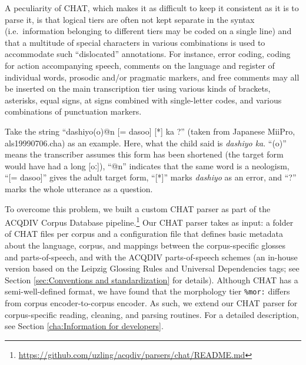 \documentclass[a4paper, 11pt]{book}
\begin{document}
A peculiarity of CHAT, which makes it as difficult to keep it consistent as it is to parse it, is that logical tiers are often not kept separate in the syntax (i.e.\ information belonging to different tiers may be coded on a single line) and that a multitude of special characters in various combinations is used to accommodate such “dislocated” annotations. For instance, error coding, coding for action accompanying speech, comments on the language and register of individual words, prosodic and/or pragmatic markers, and free comments may all be inserted on the main transcription tier using various kinds of brackets, asterisks, equal signs, at signs combined with single-letter codes, and various combinations of punctuation markers. 

Take the string “dashiyo(o)@n [= dasoo] [*] ka ?” (taken from Japanese MiiPro, als19990706.cha) as an example. Here, what the child said is \emph{dashiyo ka}. “(o)” means the transcriber assumes this form has been shortened (the target form would have had a long [oː]), “@n” indicates that the same word is a neologism, “[= dasoo]” gives the adult target form, “[*]” marks \emph{dashiyo} as an error, and “?” marks the whole utterance as a question. 


To overcome this problem, we built a custom CHAT parser as part of the ACQDIV Corpus Database pipeline.\footnote{\url{https://github.com/uzling/acqdiv/parsers/chat/README.md}} Our CHAT parser takes as input: a folder of CHAT files per corpus and a configuration file that defines basic metadata about the language, corpus, and mappings between the corpus-specific glosses and parts-of-speech, and with the ACQDIV parts-of-speech schemes (an in-house version based on the Leipzig Glossing Rules and Universal Dependencies tags; see Section \ref{sec:Conventions and standardization} for details). Although CHAT has a semi-well-defined format, we have found that the morphology tier \texttt{\%mor:} differs from corpus encoder-to-corpus encoder. As such, we extend our CHAT parser for corpus-specific reading, cleaning, and parsing routines. For a detailed description, see Section \ref{cha:Information for developers}.
\end{document}

